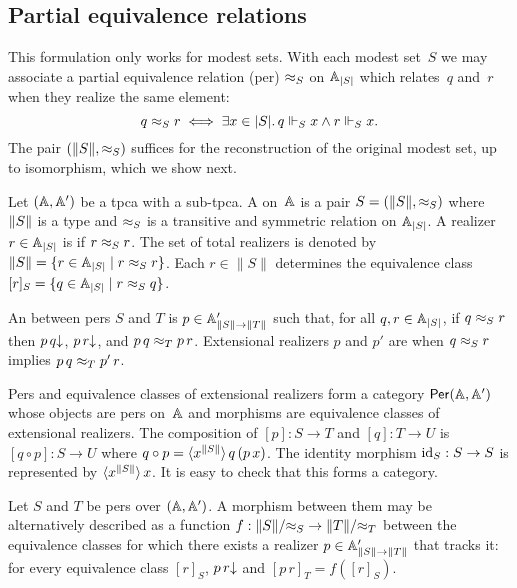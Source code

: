 \subsection{Partial equivalence relations}
\label{sec:pers}

This formulation only works for modest sets. With each modest set~$S$ we may associate a partial equivalence relation (per) $\per_S$ on $\xAtyp{S}$ which relates~$q$ and~$r$ when they realize the same element:
%
\begin{equation*}
  q \per_S r \iff
  \some{x \in \S{S}} q \rz[S] x \land r \rz[S] x.
\end{equation*}
%
The pair $(\T{S}, {\per_S})$ suffices for the reconstruction of the
original modest set, up to isomorphism, which we show next.

Let $(\AA, \subAA)$ be a tpca with a sub-tpca. A  on~$\AA$ is a pair $S = (\T{S}, {\per_S})$ where
$\T{S}$ is a type and $\per_S$ is a transitive and symmetric
relation on $\xAtyp{S}$. A realizer $r \in \xAtyp{S}$ is  if
$r \per_S r$. The set of total realizers is denoted by $\|S\| = \set{r
  \in \xAtyp{S} \such r \per_S r}$. Each $r \in \|S\|$ determines
the equivalence class $[r]_S = \set{q \in \xAtyp{S} \such r \per_S q}$.

An  between pers $S$ and $T$ is $p \in
\subAtyp{\T{S} \to \T{T}}$ such that, for all $q, r \in \xAtyp{S}$, if $q
\per_S r$ then $\defined{p\,q}$, $\defined{p\,r}$, and $p\,q \per_T
p\,r$. Extensional realizers $p$ and $p'$ are  when
$q \per_S r$ implies $p\,q \per_T p'\,r$.

Pers and equivalence classes of extensional realizers form a category
$\Per{\AA, \subAA}$ whose objects are pers on~$\AA$ and morphisms are
equivalence classes of extensional realizers. The composition of $[p]
: S \to T$ and $[q] : T \to U$ is $[q \circ p] : S \to U$ where $q
\circ p = \tpcalam{x}{\T{S}}{q\,(p\,x)}$. The identity morphism
$\id[S] : S \to S$ is represented by $\tpcalam{x}{\T{S}} x$. It
is easy to check that this forms a category.

Let $S$ and $T$ be pers over $(\AA, \subAA)$. A morphism between them
may be alternatively described as a function $f : \|S\|/{\per_S} \to
\|T\|/{\per_T}$ between the equivalence classes for which there exists
a realizer $p \in \subAtyp{\T{S} \to \T{T}}$ that tracks it: for every
equivalence class $[r]_S$, $\defined{p\,r}$ and $[p\,r]_T = f([r]_S)$.


